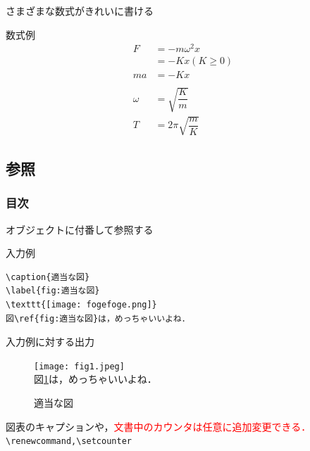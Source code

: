 \documentclass[dvipdfmx]{beamer}
\begin{document}
\begin{frame}{さまざまな数式がきれいに書ける}
    \begin{exampleblock}{数式例}
        \begin{align*}
            F &= -m\omega^2x\tag{復元力}\\
              &= -Kx (K\geq 0)\\
            ma &= -Kx\\\\
            \omega &=\sqrt{\dfrac{K}{m}}\\
            T &= 2\pi\sqrt{\dfrac{m}{K}}\tag{復元力による単振動の周期}
        \end{align*}
    \end{exampleblock}
\end{frame}

\subsection{参照}
\begin{frame}
    \frametitle{目次}
    \tableofcontents[currentsection,sectionstyle=show/shaded,subsectionstyle=show/shaded]
\end{frame}

\begin{frame}[fragile]{オブジェクトに付番して参照する}
\begin{exampleblock}{入力例}
    \begin{verbatim}
\caption{適当な図}
\label{fig:適当な図}
\texttt{[image: fogefoge.png]}
図\ref{fig:適当な図}は，めっちゃいいよね．
    \end{verbatim}
\end{exampleblock}
\begin{exampleblock}{入力例に対する出力}
    \begin{figure}[h]
        \centering
        \caption{適当な図}
        \label{fig:適当な図}
        \texttt{[image: fig1.jpeg]}\\
        図\ref{fig:適当な図}は，めっちゃいいよね．
    \end{figure}
\end{exampleblock}
図表のキャプションや，\textcolor{red}{文書中のカウンタは任意に追加変更できる．}\verb|\renewcommand,\setcounter|
\end{frame}
\end{document}
